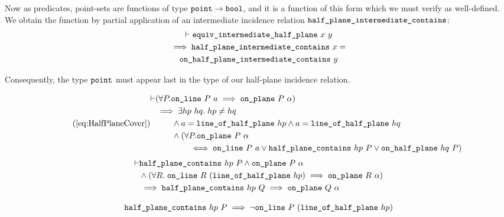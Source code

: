 Now as predicates, point-sets are functions of type $\texttt{point} \rightarrow \texttt{bool}$, and it is a function of this form which we must verify as well-defined. We obtain the function by partial application of an intermediate incidence relation $\texttt{half\_plane\_intermediate\_contains}$:
\begin{multline*}
\vdash\texttt{equiv\_intermediate\_half\_plane}\ x\ y \\
\implies \texttt{half\_plane\_intermediate\_contains}\ x =\\ \texttt{on\_half\_plane\_intermediate\_contains}\ y
\end{multline*}

Consequently, the type $\texttt{point}$ must appear last in the type of our half-plane incidence relation.
\begin{figure}
\begin{equation}\tag{\ref{eq:HalfPlaneCover}}
  \begin{split}
    \vdash&(\forall P. \code{on\_line}\ P\ a \implies \code{on\_plane}\ P\ \alpha)\\
    &\implies \exists hp\ hq.\; hp \neq hq\\
    &\qquad \wedge a = \code{line\_of\_half\_plane}\ hp \wedge a = \code{line\_of\_half\_plane}\ hq\\
    &\qquad \wedge (\forall P. \code{on\_plane}\ P\ \alpha\\
    &\qquad\qquad \iff \code{on\_line}\ P\ a \vee \code{half\_plane\_contains}\ hp\ P \vee \code{on\_half\_plane}\ hq\ P)
  \end{split}
\end{equation}
  \begin{equation}\label{eq:halfPlaneOnPlane}
    \begin{split}
      \vdash&\code{half\_plane\_contains}\ hp\ P \wedge \code{on\_plane}\ P\ \alpha \\
      &\wedge (\forall R.\;\code{on\_line}\ R\ (\code{line\_of\_half\_plane}\ hp) \implies \code{on\_plane}\ R\ \alpha) \\
      &\implies \code{half\_plane\_contains}\ hp\ Q \implies \code{on\_plane}\ Q\ \alpha
    \end{split}
  \end{equation}
  
  \begin{equation}\label{eq:halfPlaneNotOnLine}
    \code{half\_plane\_contains}\ hp\ P \implies \neg\code{on\_line}\ P\ (\code{line\_of\_half\_plane}\ hp)
  \end{equation}
  

\end{figure}
